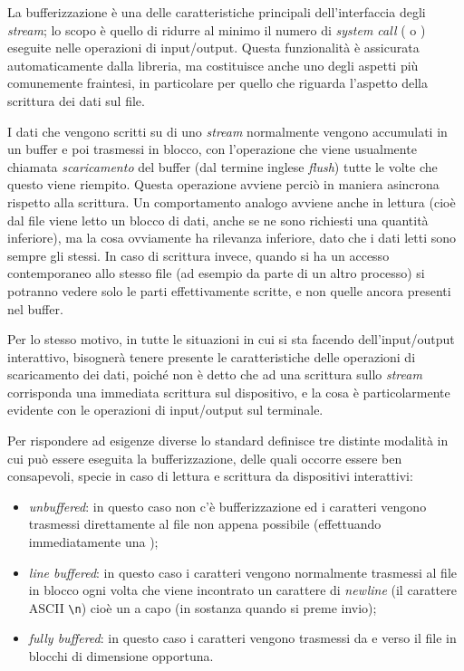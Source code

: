 La bufferizzazione è una delle caratteristiche principali dell'interfaccia
degli \textit{stream}; lo scopo è quello di ridurre al minimo il numero di
\textit{system call} ( o ) eseguite nelle operazioni di
input/output. Questa funzionalità è assicurata automaticamente dalla libreria,
ma costituisce anche uno degli aspetti più comunemente fraintesi, in
particolare per quello che riguarda l'aspetto della scrittura dei dati sul
file.

I dati che vengono scritti su di uno \textit{stream} normalmente vengono
accumulati in un buffer e poi trasmessi in blocco, con l'operazione che viene
usualmente chiamata \textsl{scaricamento} del buffer (dal termine inglese
\textit{flush}) tutte le volte che questo viene riempito. Questa operazione
avviene perciò in maniera asincrona rispetto alla scrittura. Un comportamento
analogo avviene anche in lettura (cioè dal file viene letto un blocco di dati,
anche se ne sono richiesti una quantità inferiore), ma la cosa ovviamente ha
rilevanza inferiore, dato che i dati letti sono sempre gli stessi. In caso di
scrittura invece, quando si ha un accesso contemporaneo allo stesso file (ad
esempio da parte di un altro processo) si potranno vedere solo le parti
effettivamente scritte, e non quelle ancora presenti nel buffer.

Per lo stesso motivo, in tutte le situazioni in cui si sta facendo
dell'input/output interattivo, bisognerà tenere presente le caratteristiche
delle operazioni di scaricamento dei dati, poiché non è detto che ad una
scrittura sullo \textit{stream} corrisponda una immediata scrittura sul
dispositivo, e la cosa è particolarmente evidente con le operazioni di
input/output sul terminale.

Per rispondere ad esigenze diverse lo standard definisce tre distinte modalità
in cui può essere eseguita la bufferizzazione, delle quali occorre essere ben
consapevoli, specie in caso di lettura e scrittura da dispositivi interattivi:
\begin{itemize}
\item \textit{unbuffered}: in questo caso non c'è bufferizzazione ed i
  caratteri vengono trasmessi direttamente al file non appena possibile
  (effettuando immediatamente una );
\item \textit{line buffered}: in questo caso i caratteri vengono normalmente
  trasmessi al file in blocco ogni volta che viene incontrato un carattere di
  \textit{newline} (il carattere ASCII \verb|\n|) cioè un a capo (in sostanza
  quando si preme invio);
\item \textit{fully buffered}: in questo caso i caratteri vengono
  trasmessi da e verso il file in blocchi di dimensione opportuna.
\end{itemize}

